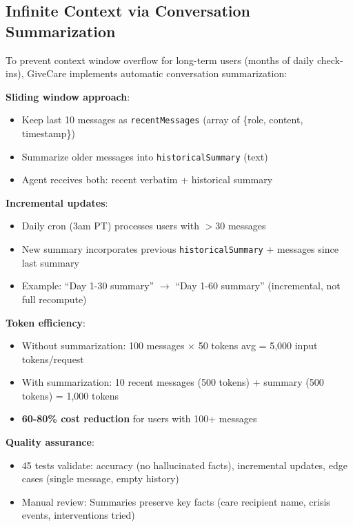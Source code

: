 \documentclass{article}%
\begin{document}
%
\subsection{Infinite Context via Conversation Summarization}%
\label{subsec:InfiniteContextviaConversationSummarization}%
To prevent context window overflow for long-term users (months of daily check-ins), GiveCare implements automatic conversation summarization:

\textbf{Sliding window approach}:
\begin{itemize}
    \item Keep last 10 messages as \texttt{recentMessages} (array of \{role, content, timestamp\})
    \item Summarize older messages into \texttt{historicalSummary} (text)
    \item Agent receives both: recent verbatim + historical summary
\end{itemize}

\textbf{Incremental updates}:
\begin{itemize}
    \item Daily cron (3am PT) processes users with $>$30 messages
    \item New summary incorporates previous \texttt{historicalSummary} + messages since last summary
    \item Example: ``Day 1-30 summary'' $\rightarrow$ ``Day 1-60 summary'' (incremental, not full recompute)
\end{itemize}

\textbf{Token efficiency}:
\begin{itemize}
    \item Without summarization: 100 messages $\times$ 50 tokens avg = 5,000 input tokens/request
    \item With summarization: 10 recent messages (500 tokens) + summary (500 tokens) = 1,000 tokens
    \item \textbf{60-80\% cost reduction} for users with 100+ messages
\end{itemize}

\textbf{Quality assurance}:
\begin{itemize}
    \item 45 tests validate: accuracy (no hallucinated facts), incremental updates, edge cases (single message, empty history)
    \item Manual review: Summaries preserve key facts (care recipient name, crisis events, interventions tried)
\end{itemize}
\end{document}
